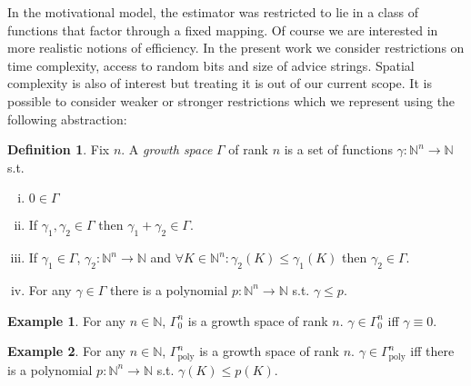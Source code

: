 \documentclass{article}
\numberwithin{equation}{section}
\theoremstyle{definition}
\newtheorem{definition}{Definition}[section]
\newtheorem{example}{Example}[section]
\theoremstyle{plain}
\newcommand{\Nats}{\mathbb{N}}
\begin{document}
In the motivational model, the estimator was restricted to lie in a class of functions that factor through a fixed mapping. Of course we are interested in more realistic notions of efficiency. In the present work we consider restrictions on time complexity, access to random bits and size of advice strings. Spatial complexity is also of interest but treating it is out of our current scope. It is possible to consider weaker or stronger restrictions which we represent using the following abstraction:

\begin{samepage}
\begin{definition}

Fix $n$. A \emph{growth space} $\Gamma$ of rank $n$ is a set of functions ${\gamma: \Nats^n \rightarrow \Nats}$ s.t.

\begin{enumerate}[(i)]

\item $0 \in \Gamma$

\item If $\gamma_1, \gamma_2 \in \Gamma$ then $\gamma_1 + \gamma_2 \in \Gamma$.

\item If $\gamma_1 \in \Gamma$, $\gamma_2: \Nats^n \rightarrow \Nats$ and $\forall K \in \Nats^n: \gamma_2(K) \leq \gamma_1(K)$ then $\gamma_2 \in \Gamma$.

\item For any $\gamma \in \Gamma$ there is a polynomial $p: \Nats^n \rightarrow \Nats$ s.t. $\gamma \leq p$.

\end{enumerate}

\end{definition}
\end{samepage}

\begin{example}

For any $n \in \Nats$, $\Gamma_0^n$ is a growth space of rank $n$. $\gamma \in \Gamma_0^n$ iff $\gamma \equiv 0$.

\end{example}

\begin{example}

For any $n \in \Nats$, $\Gamma_{\text{poly}}^n$ is a growth space of rank $n$. $\gamma \in \Gamma_{\text{poly}}^n$ iff there is a polynomial $p: \Nats^n \rightarrow \Nats$ s.t. $\gamma(K) \leq p(K)$.

\end{example}
\end{document}
